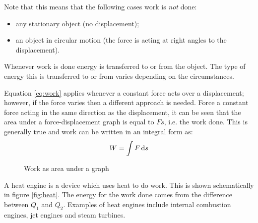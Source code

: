 \documentclass[revision-guide.tex]{subfiles}
\begin{document}
Note that this means that the following cases work is \emph{not} done:
\begin{itemize}
  \item any stationary object (no displacement);
  \item an object in circular motion (the force is acting at right angles to the displacement).
\end{itemize}

Whenever work is done energy is transferred to or from the object. The type of energy this is transferred to or from varies depending on the circumstances.


Equation \ref{eq:work} applies whenever a constant force acts over a displacement; however, if the force varies then a different approach is needed. Force a constant force acting in the same direction as the displacement, it can be seen that the area under a force-displacement graph is equal to $Fs$, i.e. the work done. This is generally true and work can be written in an integral form as:
\begin{equation}\label{eq:work-integral}
  W = \int F \,\mathrm{d} s
\end{equation}

\begin{figure}[h]
  \begin{center}
  \end{center}
  \caption{Work as area under a graph}
  \label{fig:work-graph}
\end{figure}


A heat engine is a device which uses heat to do work. This is shown schematically in figure \ref{fig:heat}. The energy for the work done comes from the difference between $Q_1$ and $Q_2$.
Examples of heat engines include internal combustion engines, jet engines and steam turbines.
\end{document}
